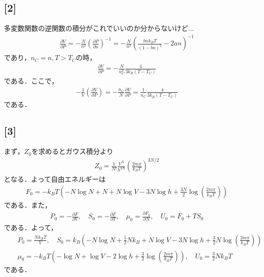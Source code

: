 \documentclass[12pt,dvipdfmx]{jsarticle}
\begin{document}
\subsection*{\large{[2]}}
多変数関数の逆関数の積分がこれでいいのか分からないけど...
\begin{eqnarray}
  \frac{\partial V}{\partial P} = -\frac{N}{n^2}\left( \frac{\partial P}{\partial n} \right)^{-1} = -\frac{N}{n^2}\left( \frac{bnk_BT}{(1-bn)^2}-2an \right)^{-1}
\end{eqnarray}
であり，$n_C=n, T>T_C$の時，
\begin{eqnarray}
  \frac{\partial V}{\partial P}=-\frac{N}{n_C^2} \frac{4}{3k_B(T-T_C)}
\end{eqnarray}
である．ここで，
\begin{eqnarray}
  -\frac{1}{V}\left( \frac{\partial V}{\partial P} \right)=-\frac{n_C}{N}\frac{\partial V}{\partial P} = \frac{1}{n_C} \frac{4}{3k_B(T-T_C)}
\end{eqnarray}
である．
\subsection*{\large{[3]}}
まず，$Z_0$を求めるとガウス積分より
\begin{eqnarray}
  Z_0 = \frac{1}{N!}\frac{V^{N}}{h^{3N}}\left( \frac{2m\pi}{k_B T} \right)^{3N/2}
\end{eqnarray}
となる．よって自由エネルギーは
\begin{eqnarray}
  F_0 = -k_BT \left( -N\log N +N + N\log V -3N\log h + \frac{3N}{2}\log\left( \frac{2m\pi}{k_B T} \right) \right)
\end{eqnarray}
である．また，
\begin{eqnarray}
  P_0 = -\frac{\partial F}{\partial V}, \quad S_0=-\frac{\partial F}{\partial T},\quad \mu_0 = \frac{\partial F_0}{\partial N}, \quad U_0 = F_0 + T S_0
\end{eqnarray}
である．よって，
\begin{eqnarray}
  &&P_0 = \frac{Nk_B T}{V}, \quad S_0 = k_B \left( -N\log N + \frac{5}{2}Nk_B + N\log V-3N\log h + \frac{3}{2}N\log\left( \frac{2m\pi}{k_B T} \right) \right)\\
  &&\mu_0 = -k_B T\left( -\log N + \log V -2\log h + \frac{3}{2}\log\left( \frac{2m\pi}{k_B T} \right) \right), \quad U_0 = \frac{3}{2}Nk_B T
\end{eqnarray}
である．
\end{document}

